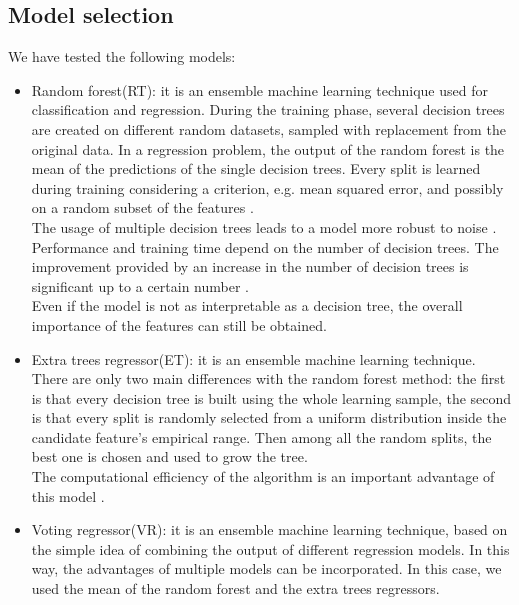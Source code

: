 \documentclass[conference]{IEEEtran}
\begin{document}
\subsection{Model selection}
We have tested the following models:
\begin{itemize}
    \item Random forest(RT): it is an ensemble machine learning technique used for classification and regression. During the training phase, several decision trees are created on different random datasets, sampled with replacement from the original data. In a regression problem, the output of the random forest is the mean of the predictions of the single decision trees. Every split is learned during training considering a criterion, e.g. mean squared error, and possibly on a random subset of the features \cite{randomForest} \cite{extraTree}.\\
The usage of multiple decision trees leads to a model more robust to noise \cite{randomForest}. Performance and training time depend on the number of decision trees. The improvement provided by an increase in the number of decision trees is significant up to a certain number \cite{limitNumTrees}.\\
Even if the model is not as interpretable as a decision tree, the overall importance of the features can still be obtained.
\item Extra trees regressor(ET): it is an ensemble machine learning technique. There are only two main differences with the random forest method: the first is that every decision tree is built using the whole learning sample, the second is that every split is randomly selected from a uniform distribution inside the candidate feature's empirical range. Then among all the random splits, the best one is chosen and used to grow the tree. \\
The computational efficiency of the algorithm is an important advantage of this model \cite{extraTree}.
\item Voting regressor(VR): it is an ensemble machine learning technique, based on the simple idea of combining the output of different regression models. In this way, the advantages of multiple models can be incorporated. In this case, we used the mean of the random forest and the extra trees regressors. %
\end{itemize}
\end{document}
